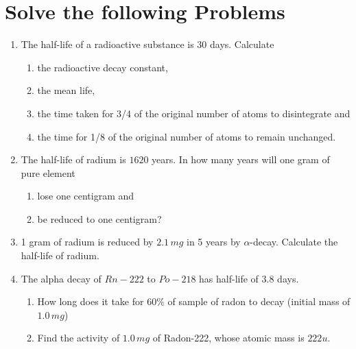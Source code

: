 \documentclass[../main.tex]{subfiles}
\begin{document}
\section{Solve the following Problems}
\begin{enumerate}
    \item The half-life of a radioactive substance is $ 30 $ days. Calculate
    \begin{enumerate}
        \item the radioactive decay constant,
        \item the mean life,
        \item the time taken for 3/4 of the original number of atoms to disintegrate and
        \item the time for 1/8 of the original number of atoms to remain unchanged.
    \end{enumerate}
    \item The half-life of radium is $ 1620 $ years. In how many years will one gram of pure element
    \begin{enumerate}
        \item lose one centigram and
        \item be reduced to one centigram?
    \end{enumerate}
    \item 1 gram of radium is reduced by $ 2.1 \,mg $ in 5 years by	$ \alpha $-decay. Calculate the half-life of radium.
    \item The alpha decay of $ Rn-222 $ to $ Po-218 $ has half-life of $ 3.8 $ days.
    \begin{enumerate}
        \item How long does it take for $ 60\% $ of sample of radon to decay (initial mass of $ 1.0\,mg $)
        \item Find the activity of $ 1.0\,mg $ of Radon-222, whose atomic mass is $ 222u $.
    \end{enumerate}
\end{enumerate}
\end{document}
